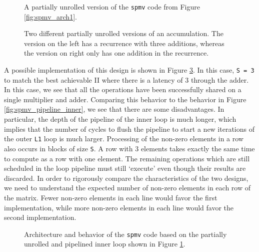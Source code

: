 \begin{figure}
{\footnotesize }
\caption{A partially unrolled version of the \lstinline|spmv| code from Figure \ref{fig:spmv_arch1}.}
\label{fig:spmv_unrolled}
\end{figure}

\begin{figure}
\centering
{\tiny }
\caption{Two different partially unrolled versions of an accumulation.  The version on the left has a recurrence with three additions, whereas the version on right only has one addition in the recurrence.}
\label{fig:spmv_partial_unroll}
\end{figure}

A possible implementation of this design is shown in Figure \ref{fig:spmv_unrolled_behavior}.  In this case, \lstinline|S = 3| to match the best achievable II where there is a latency of 3 through the adder.  In this case, we see that all the operations have been successfully shared on a single multiplier and adder.  Comparing this behavior to the behavior in Figure \ref{fig:spmv_pipeline_inner}, we see that there are some disadvantages.  In particular, the depth of the pipeline of the inner loop is much longer, which implies that the number of cycles to flush the pipeline to start a new iterations of the outer \lstinline|L1| loop is much larger.  Processing of the non-zero elements in a row also occurs in blocks of size \lstinline|S|.  A row with 3 elements takes exactly the same time to compute as a row with one element.  The remaining operations which are still scheduled in the loop pipeline must still `execute' even though their results are discarded.  In order to rigorously compare the characteristics of the two designs, we need to understand the expected number of non-zero elements in each row of the matrix.  Fewer non-zero elements in each line would favor the first implementation, while more non-zero elements in each line would favor the second implementation.

\begin{figure}
\centering
{\tiny }
\caption{Architecture and behavior of the \lstinline{spmv} code based on the partially unrolled and pipelined inner loop shown in Figure \ref{fig:spmv_unrolled}.}
\label{fig:spmv_unrolled_behavior}
\end{figure}


